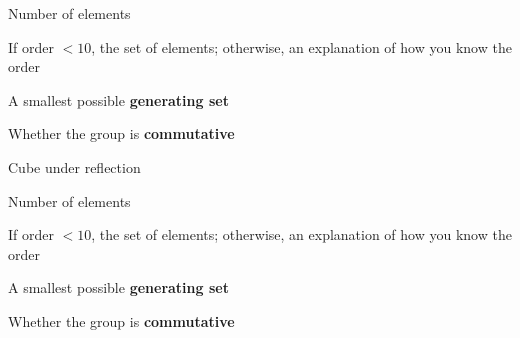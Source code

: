\documentclass[../gatm_answers.tex]{subfiles}
\begin{document}
\begin{inner_problem}[start=1]
\item Number of elements
\end{inner_problem}

\begin{inner_problem}
\item If order $< 10$, the set of elements; otherwise, an explanation of how you know the order
\end{inner_problem}

\begin{inner_problem}
\item A smallest possible \textbf{generating set}
\end{inner_problem}

\begin{inner_problem}
\item Whether the group is \textbf{commutative}
\end{inner_problem}

\begin{outer_problem}
\item Cube under reflection
\end{outer_problem}

\begin{inner_problem}[start=1]
\item Number of elements
\end{inner_problem}

\begin{inner_problem}
\item If order $< 10$, the set of elements; otherwise, an explanation of how you know the order
\end{inner_problem}

\begin{inner_problem}
\item A smallest possible \textbf{generating set}
\end{inner_problem}

\begin{inner_problem}
\item Whether the group is \textbf{commutative}
\end{inner_problem}
\end{document}
